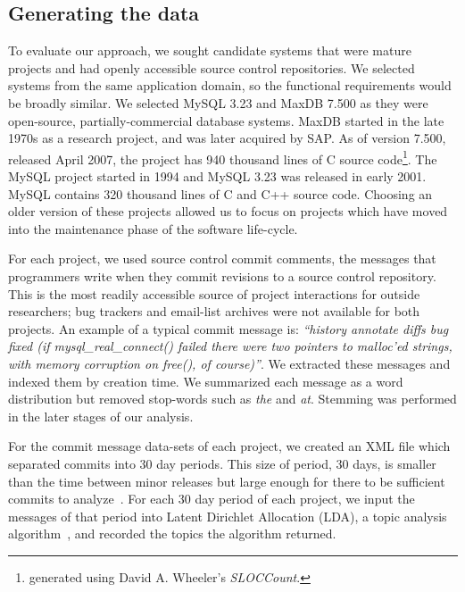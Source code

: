 \documentclass[]{sig-alternate}
\begin{document}
\subsection{Generating the data}
\label{sec:wordlist}

To evaluate our approach, we sought candidate systems that were mature projects and had openly accessible source control repositories. 
We selected systems from the same application domain, so the functional requirements would be broadly similar. 
We selected MySQL 3.23 and MaxDB 7.500 as they were open-source, partially-commercial database systems. 
MaxDB started in the late 1970s as a research project, and was later acquired by SAP. 
As of version 7.500, released April 2007, the project has 940 thousand lines of C source code\footnote{generated using David A. Wheeler's \emph{SLOCCount}.}. 
The MySQL project started in 1994 and MySQL 3.23 was released in early 2001. 
MySQL contains 320 thousand lines of C and C++ source code.  
Choosing an older version of these projects allowed us to focus on projects which have moved into the maintenance phase of the software life-cycle.

For each project, we used source control commit comments, the messages that programmers write when they commit revisions to a source control repository. 
This is the most readily accessible source of project interactions for outside researchers; bug trackers and email-list archives were not available for both projects. 
An example of a typical commit message is: \textit{``history annotate diffs bug fixed (if mysql\-\_real\-\_connect() failed there were two pointers to malloc'ed strings, with memory corruption on free(), of course)''}. 
We extracted these messages and indexed them by creation time. 
We summarized each message as a word distribution but removed stop-words such as \emph{the} and \emph{at}. 
Stemming was performed in the later stages of our analysis. %

For the commit message data-sets of each project, we created an XML file which separated commits into 30 day periods. 
This size of period, 30 days, is smaller than the time between minor releases but large enough for there to be sufficient commits to analyze~\cite{Hindle09ICSM}. 
For each 30 day period of each project, we input the messages of that period into Latent Dirichlet Allocation (LDA), a topic analysis algorithm~\cite{Blei2003}, and recorded the topics the algorithm returned.
\end{document}
